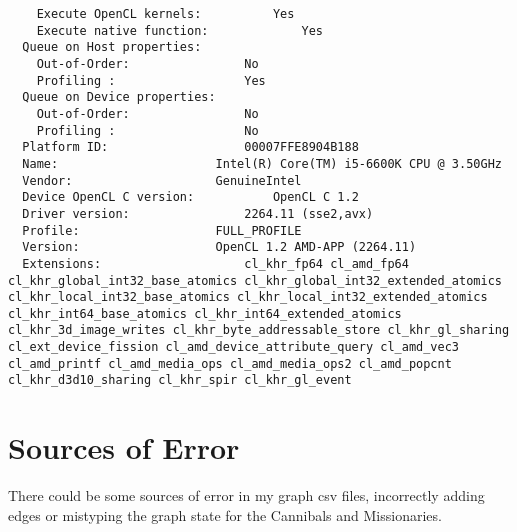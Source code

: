 \documentclass[12pt]{article}
\begin{document}
\begin{lstlisting}
    Execute OpenCL kernels:			 Yes
    Execute native function:			 Yes
  Queue on Host properties:				 
    Out-of-Order:				 No
    Profiling :					 Yes
  Queue on Device properties:				 
    Out-of-Order:				 No
    Profiling :					 No
  Platform ID:					 00007FFE8904B188
  Name:						 Intel(R) Core(TM) i5-6600K CPU @ 3.50GHz
  Vendor:					 GenuineIntel
  Device OpenCL C version:			 OpenCL C 1.2 
  Driver version:				 2264.11 (sse2,avx)
  Profile:					 FULL_PROFILE
  Version:					 OpenCL 1.2 AMD-APP (2264.11)
  Extensions:					 cl_khr_fp64 cl_amd_fp64 cl_khr_global_int32_base_atomics cl_khr_global_int32_extended_atomics cl_khr_local_int32_base_atomics cl_khr_local_int32_extended_atomics cl_khr_int64_base_atomics cl_khr_int64_extended_atomics cl_khr_3d_image_writes cl_khr_byte_addressable_store cl_khr_gl_sharing cl_ext_device_fission cl_amd_device_attribute_query cl_amd_vec3 cl_amd_printf cl_amd_media_ops cl_amd_media_ops2 cl_amd_popcnt cl_khr_d3d10_sharing cl_khr_spir cl_khr_gl_event 
\end{lstlisting}

\section{ Sources of Error}
There could be some sources of error in my graph csv files, 
incorrectly adding edges or mistyping the graph state for the Cannibals and Missionaries.



\end{document}
